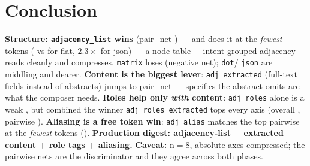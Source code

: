 \documentclass[11pt]{article}
\begin{document}
\section*{Conclusion}
\textbf{Structure: \texttt{adjacency\_list} wins} (pair\_net \structNet{}) --- and does it at the
\emph{fewest} tokens (\structTok{} vs \flatTok{} for flat, $2.3\times$ for json) --- a node table $+$
intent-grouped adjacency reads cleanly and compresses. \texttt{matrix} loses (negative net); \texttt{dot}/
\texttt{json} are middling and dearer. \textbf{Content is the biggest lever}: \texttt{adj\_extracted}
(full-text fields instead of abstracts) jumps to pair\_net \extractedNet{} --- specifics the abstract
omits are what the composer needs. \textbf{Roles help only \emph{with} content}: \texttt{adj\_roles}
alone is a weak \rolesNet{}, but combined the winner \texttt{adj\_roles\_extracted} tops every axis
(overall \winOverall{}, pairwise \winWtl{}). \textbf{Aliasing is a free token win}: \texttt{adj\_alias}
matches the top pairwise at the \emph{fewest} tokens (\aliasTok{}). \textbf{Production digest:
adjacency-list $+$ extracted content $+$ role tags $+$ aliasing.} \textbf{Caveat:} n$=8$, absolute axes
compressed; the pairwise nets are the discriminator and they agree across both phases.
\end{document}
